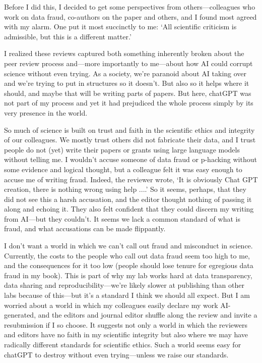\documentclass[11pt]{article}
\begin{document}
Before I did this, I decided to get some perspectives from others---colleagues who work on data fraud, co-authors on the paper and others, and I found most agreed with my alarm. One put it most succinctly to me: `All scientific criticism is admissible, but this is a different matter.' 

I realized these reviews captured both something inherently broken about the peer review process and---more importantly to me---about how AI could corrupt science without even trying. As a society, we're paranoid about AI taking over and we're trying to put in structures so it doesn't. But also so it helps where it should, and maybe that will be writing parts of papers. But here, chatGPT was not part of my process and yet it had prejudiced the whole process simply by its very presence in the world. 

So much of science is built on trust and faith in the scientific ethics and integrity of our colleagues. We mostly trust others did not fabricate their data, and I trust people do not (yet) write their papers or grants using large language models without telling me. I wouldn't accuse someone of data fraud or p-hacking without some evidence and logical thought, but a colleague felt it was easy enough to accuse me of writing fraud. Indeed, the reviewer wrote, `It is obviously Chat GPT creation, there is nothing wrong using help ....' So it seems, perhaps, that they did not see this a harsh accusation, and the editor thought nothing of passing it along and echoing it. They also felt confident that they could discern my writing from AI---but they couldn't. It seems we lack a common standard of what is fraud, and what accusations can be made flippantly.

I don't want a world in which we can't call out fraud and misconduct in science. Currently, the costs to the people who call out data fraud seem too high to me, and the consequences for it too low (people should lose tenure for egregious data fraud in my book). This is part of why my lab works hard at data transparency, data sharing and reproducibility---we're likely slower at publishing than other labs because of this---but it's a standard I think we should all expect. But I am worried about a world in which my colleagues easily declare my work AI-generated, and the editors and journal editor shuffle along the review and invite a resubmission if I so choose. It suggests not only a world in which the reviewers and editors have no faith in my scientific integrity but also where we may have radically different standards for scientific ethics. Such a world seems easy for chatGPT to destroy without even trying---unless we raise our standards. 
\end{document}
